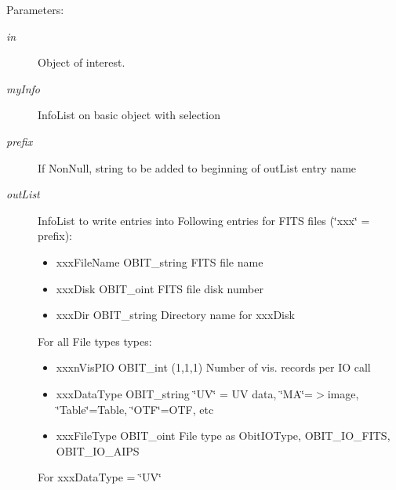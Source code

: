 \begin{Desc}
\item[Parameters:]
\begin{description}
\item[{\em in}]Object of interest. \item[{\em my\-Info}]Info\-List on basic object with selection \item[{\em prefix}]If Non\-Null, string to be added to beginning of out\-List entry name \item[{\em out\-List}]Info\-List to write entries into Following entries for FITS files (\char`\"{}xxx\char`\"{} = prefix): \begin{itemize}
\item xxx\-File\-Name OBIT\_\-string FITS file name \item xxx\-Disk OBIT\_\-oint FITS file disk number \item xxx\-Dir OBIT\_\-string Directory name for xxx\-Disk\end{itemize}
For all File types types: \begin{itemize}
\item xxxn\-Vis\-PIO OBIT\_\-int (1,1,1) Number of vis. records per IO call \item xxx\-Data\-Type OBIT\_\-string \char`\"{}UV\char`\"{} = UV data, \char`\"{}MA\char`\"{}=$>$image, \char`\"{}Table\char`\"{}=Table, \char`\"{}OTF\char`\"{}=OTF, etc \item xxx\-File\-Type OBIT\_\-oint File type as Obit\-IOType, OBIT\_\-IO\_\-FITS, OBIT\_\-IO\_\-AIPS\end{itemize}
For xxx\-Data\-Type = \char`\"{}UV\char`\"{} \begin{itemize}

\end{itemize}
\end{description}
\end{Desc}
